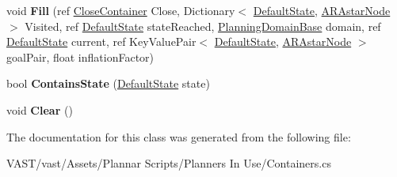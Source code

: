 \begin{DoxyCompactItemize}
\item 
\hypertarget{class_plan_container_aaae2bc99a50902c06aeb128b9152b4f0}{void {\bfseries Fill} (ref \hyperlink{class_close_container}{Close\-Container} Close, Dictionary$<$ \hyperlink{class_default_state}{Default\-State}, \hyperlink{class_a_r_astar_node}{A\-R\-Astar\-Node} $>$ Visited, ref \hyperlink{class_default_state}{Default\-State} state\-Reached, \hyperlink{class_planning_domain_base}{Planning\-Domain\-Base} domain, ref \hyperlink{class_default_state}{Default\-State} current, ref Key\-Value\-Pair$<$ \hyperlink{class_default_state}{Default\-State}, \hyperlink{class_a_r_astar_node}{A\-R\-Astar\-Node} $>$ goal\-Pair, float inflation\-Factor)}\label{class_plan_container_aaae2bc99a50902c06aeb128b9152b4f0}

\item 
\hypertarget{class_plan_container_a49a5878c3e1d12926d9bac5b93ab8fbc}{bool {\bfseries Contains\-State} (\hyperlink{class_default_state}{Default\-State} state)}\label{class_plan_container_a49a5878c3e1d12926d9bac5b93ab8fbc}

\item 
\hypertarget{class_plan_container_a16479b9695345f4ca9385f85f4632716}{void {\bfseries Clear} ()}\label{class_plan_container_a16479b9695345f4ca9385f85f4632716}

\end{DoxyCompactItemize}


The documentation for this class was generated from the following file\-:\begin{DoxyCompactItemize}
\item 
V\-A\-S\-T/vast/\-Assets/\-Plannar Scripts/\-Planners In Use/Containers.\-cs\end{DoxyCompactItemize}

